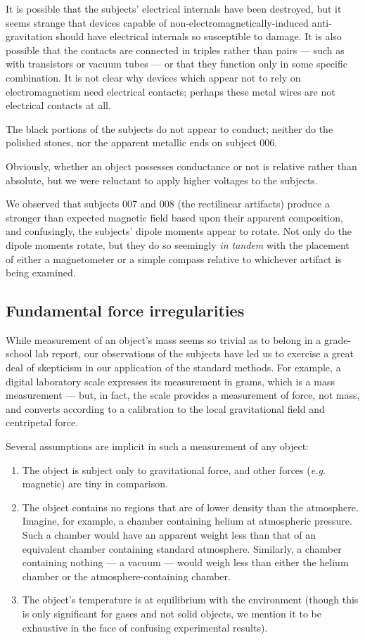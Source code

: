 \documentclass[10pt]{article}
\theoremstyle{definition}
\begin{document}
It is possible that the subjects' electrical internals have been destroyed, but it seems strange that devices capable of non-electromagnetically-induced anti-gravitation should have electrical internals so susceptible to damage.
It is also possible that the contacts are connected in triples rather than pairs --- such as with transistors or vacuum tubes --- or that they function only in some specific combination.
It is not clear why devices which appear not to rely on electromagnetism need electrical contacts; perhaps these metal wires are not electrical contacts at all.

The black portions of the subjects do not appear to conduct; neither do the polished stones, nor the apparent metallic ends on subject 006.

Obviously, whether an object possesses conductance or not is relative rather than absolute, but we were reluctant to apply higher voltages to the subjects.

We observed that subjects 007 and 008 (the rectilinear artifacts) produce a stronger than expected magnetic field based upon their apparent composition, and confusingly, the subjects' dipole moments appear to rotate.
Not only do the dipole moments rotate, but they do so seemingly \textit{in tandem} with the placement of either a magnetometer or a simple compass relative to whichever artifact is being examined.

\subsection{Fundamental force irregularities}
While measurement of an object's mass seems so trivial as to belong in a grade-school lab report, our observations of the subjects have led us to exercise a great deal of skepticism in our application of the standard methods.
For example, a digital laboratory scale expresses its measurement in grams, which is a mass measurement --- but, in fact, the scale provides a measurement of force, not mass, and converts according to a calibration to the local gravitational field and centripetal force.

Several assumptions are implicit in such a measurement of any object:
\begin{enumerate}
\item The object is subject only to gravitational force, and other forces (\textit{e.g.} magnetic) are tiny in comparison.
\item The object contains no regions that are of lower density than the atmosphere. Imagine, for example, a chamber containing helium at atmospheric pressure. Such a chamber would have an apparent weight less than that of an equivalent chamber containing standard atmosphere. Similarly, a chamber containing nothing --- a vacuum --- would weigh less than either the helium chamber or the atmosphere-containing chamber.
\item The object's temperature is at equilibrium with the environment (though this is only significant for gases and not solid objects, we mention it to be exhaustive in the face of confusing experimental results).
\end{enumerate}
\end{document}
